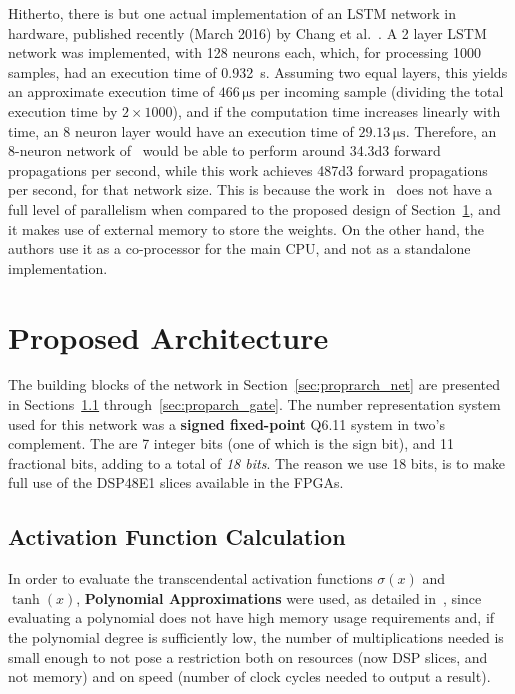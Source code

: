 \documentclass{IEEEtran}
\begin{document}
Hitherto, there is but one actual implementation of an LSTM network in hardware, published recently
(March 2016) by Chang et al.~\cite{Chang15}. A 2 layer LSTM network was implemented,
with 128 neurons each, which, for processing 1000 samples, had an execution time of \SI{0.932}{\second}. Assuming
two equal layers, this yields an approximate execution time of $466 \, \si{\micro\second}$ per incoming sample (dividing the total execution time by $2 \times 1000$), and
if the computation time increases linearly with time, an 8 neuron layer would have an execution time of $29.13 \, \si{\micro\second}$.
Therefore, an 8-neuron network of~\cite{Chang15} would be able to perform around \num{34.3d3} forward propagations per second, while this work achieves \num{487d3} forward propagations per second, for that network size. This is because the work in~\cite{Chang15} does not have a full level of parallelism when compared to the proposed design of
Section~\ref{sec:proparch}, and it makes use of external memory to store the weights. On the other hand, the authors use it as a co-processor for the main CPU, and not as a
standalone implementation.

\section{Proposed Architecture}\label{sec:proparch}

The building blocks of the network in Section~\ref{sec:proprarch_net} are presented in Sections~\ref{sec:proprarch_af} through~\ref{sec:proparch_gate}.
The number representation system used for this network was a \textbf{signed fixed-point} Q6.11 system in two's complement. The are 7 integer bits (one of which is
the sign bit), and 11 fractional bits, adding to a total of \textit{18 bits}. The reason we use 18 bits, is to make full use of the DSP48E1 slices available
in the FPGAs.

\subsection{Activation Function Calculation}\label{sec:proprarch_af}
In order to evaluate the transcendental activation functions $\sigma(x)$ and $\tanh(x)$, \textbf{Polynomial Approximations} were used, as detailed in~\cite{Muller05},
since evaluating a polynomial does not have high memory usage requirements and, if the polynomial degree is sufficiently low, the
number of multiplications needed is small enough to not pose a restriction both on resources (now DSP slices, and not memory) and on speed (number of clock cycles
needed to output a result).
\end{document}
